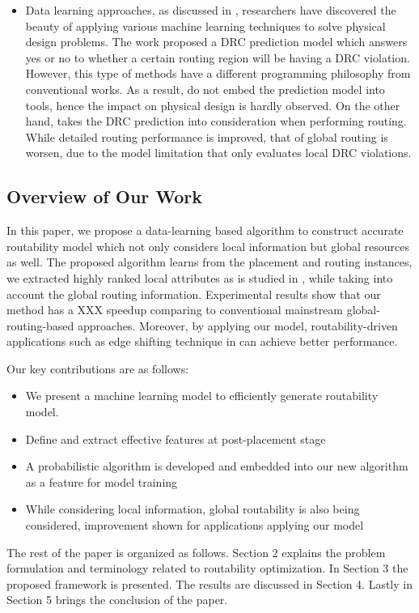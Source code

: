 \begin{itemize}
\item Data learning approaches, as discussed in \cite{mlinphysicaldesign}, researchers have discovered the beauty of applying various machine learning techniques to solve physical design problems. The work \cite{drcpredict18} proposed a DRC prediction model which answers yes or no to whether a certain routing region will be having a DRC violation. However, this type of methods have a different programming philosophy from conventional works. As a result, \cite{drcpredict18,drcDAT18} do not embed the prediction model into tools, hence the impact on physical design is hardly observed. On the other hand, \cite{drcingr} takes the DRC prediction into consideration when performing routing. While detailed routing performance is improved, that of global routing is worsen, due to the model limitation that only evaluates local DRC violations.
\end{itemize}


\subsection{Overview of Our Work}
In this paper, we propose a data-learning based algorithm to construct accurate routability model which not only considers local information but global resources as well. The proposed algorithm learns from the placement and routing instances, we extracted highly ranked local attributes as is studied in \cite{parameterstudy}, while taking into account the global routing information. Experimental results show that our method has a XXX speedup comparing to conventional mainstream global-routing-based approaches. Moreover, by applying our model, routability-driven applications such as edge shifting technique in \cite{fastroute} can achieve better performance. 

Our key contributions are as follows:
\begin{itemize}
\item We present a machine learning model to efficiently generate routability model.
\item Define and extract effective features at post-placement stage
\item A probabilistic algorithm is developed and embedded into our new algorithm as a feature for model training
\item While considering local information, global routability is also being considered, improvement shown for applications applying our model 
\end{itemize}

The rest of the paper is organized as follows. Section 2 explains the problem formulation and terminology related to routability optimization. In Section 3 the proposed framework is presented. The results are discussed in Section 4. Lastly in Section 5 brings the conclusion of the paper.